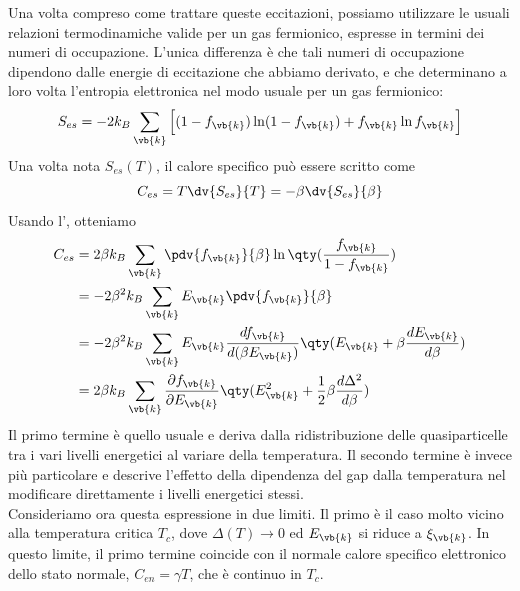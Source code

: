 Una volta compreso come trattare queste eccitazioni, possiamo utilizzare le usuali relazioni termodinamiche valide per un gas fermionico, espresse in termini dei numeri di occupazione. L'unica differenza è che tali numeri di occupazione dipendono dalle energie di eccitazione che abbiamo derivato, e che determinano a loro volta l'entropia elettronica nel modo usuale per un gas fermionico:
\begin{equation}
   S_{es}=-2k_B \sum_{\vb{k}} \Big[ (1-f_{\vb{k}}) \ln(1-f_{\vb{k}}) + f_{\vb{k}} \ln f_{\vb{k}} \Big]
   \label{eq:entropy}
\end{equation}
Una volta nota $S_{es}(T)$, il calore specifico può essere scritto come
\begin{equation}
   C_{es}
   =
   T\dv{S_{es}}{T}
   =
   -\beta\dv{S_{es}}{\beta}
   \label{eq:specific_heat_def}
\end{equation}
Usando l', otteniamo
\begin{equation}
   \begin{split}
      C_{es}
      &= 2\beta k_B \sum_{\vb{k}} \pdv{f_{\vb{k}}}{\beta} \ln\qty( \frac{f_{\vb{k}}}{1 - f_{\vb{k}}} )\\
      &= -2\beta^2 k_B \sum_{\vb{k}} E_{\vb{k}} \pdv{f_{\vb{k}}}{\beta}
      \\
      &=
      -2\beta^2 k_B
      \sum_{\vb{k}}
      E_{\vb{k}}
      \frac{
         df_{\vb{k}}
      }{
         d(\beta E_{\vb{k}})
      }
      \qty(
         E_{\vb{k}}
         +
         \beta
         \frac{dE_{\vb{k}}}{d\beta}
      )
      \\
      &=
      2\beta k_B
      \sum_{\vb{k}}
      \frac{\partial f_{\vb{k}}}{\partial E_{\vb{k}}}
      \qty(
         E_{\vb{k}}^2
         +
         \frac{1}{2}
         \beta
         \frac{d\Delta^2}{d\beta}
      )
   \end{split}
   \label{eq:specific_heat_final}
\end{equation}
Il primo termine è quello usuale e deriva dalla ridistribuzione delle quasiparticelle tra i vari livelli energetici al variare della temperatura. Il secondo termine è invece più particolare e descrive l'effetto della dipendenza del gap dalla temperatura nel modificare direttamente i livelli energetici stessi.\\
Consideriamo ora questa espressione in due limiti. Il primo è il caso molto vicino alla temperatura critica $T_c$, dove $\Delta(T)\to0$ ed $E_{\vb{k}}$ si riduce a $\xi_{\vb{k}}$. In questo limite, il primo termine coincide con il normale calore specifico elettronico dello stato normale, $C_{en}=\gamma T$, che è continuo in $T_c$.\\
